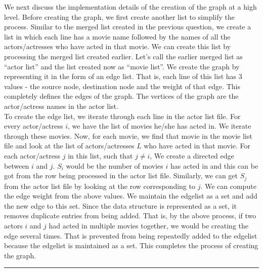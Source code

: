 \documentclass{article}
\begin{document}
We next discuss the implementation details of the creation of the graph at a high level.
Before creating the graph, we first create another list to simplify the process. Similar to the merged list created
in the previous question, we create a list in which each line has a movie name followed by the names of all the actors/actresses 
who have acted in that movie. We can create this list by processing the merged list created earlier. Let's call the earlier merged list
as ``actor list'' and the list created now as ``movie list''. We create the graph by representing it in the form of an
edge list. That is, each line of this list has 3 values - the source node, destination node and the weight of that edge. This
completely defines the edges of the graph. The vertices of the graph are the actor/actress names in the actor list.\\
To create the edge list, we iterate through each line in the actor list file. For every actor/actress $i$, we have the list 
of movies he/she has acted in. We iterate through these movies. Now, for each movie, we find that movie in the movie list 
file and look at the list of actors/actresses $L$ who have acted in that movie. For each actor/actress $j$ in this list, such that
$j \neq i$,
We create a directed edge between $i$ and $j$. $S_i$ would be the number of movies $i$ has acted in and this
can be got from the row being processed in the actor list file. Similarly, we can get $S_j$ from the actor list file 
by looking at the row corresponding to $j$. We can compute the edge weight from the above values.
We maintain the edgelist as a set and add the new edge to this set. Since the data structure is represented as a set,
it removes duplicate entries from being added. That is, by the above process, if two actors $i$ and $j$ had acted in multiple movies
together, we would be creating the edge several times. That is prevented from being repeatedly added to the edgelist because
the edgelist is maintained as a set. This completes the process of creating the graph.\\

\hrule
\end{document}
